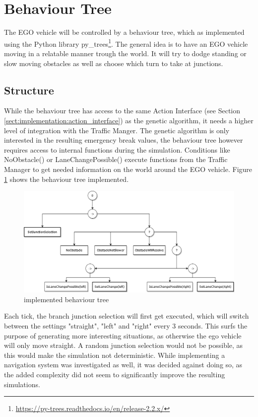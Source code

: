\section{Behaviour Tree}
The EGO vehicle will be controlled by a behaviour tree, which as implemented using the Python library py\_trees\footnote{\href{https://py-trees.readthedocs.io/en/release-2.2.x/}{https://py-trees.readthedocs.io/en/release-2.2.x/}}. The general idea is to have an EGO vehicle moving in a relatable manner trough the world. It will try to dodge standing or slow moving obstacles as well as choose which turn to take at junctions. 

\subsection{Structure}
While the behaviour tree has access to the same Action Interface (see Section \ref{sect:implementation:action_interface}) as the genetic algorithm, it needs a higher level of integration with the Traffic Manger. The genetic algorithm is only interested in the resulting emergency break values, the behaviour tree however requires access to internal functions during the simulation. Conditions like NoObstacle() or LaneChangePossible() execute functions from the Traffic Manager to get needed information on the world around the EGO vehicle. Figure \ref{fig:implementation:bt} shows the behaviour tree implemented.

\begin{figure}[ht] 
	\includegraphics[width=1\linewidth]{figures/behaviorTree}
	\caption{implemented behaviour tree}
	\label{fig:implementation:bt}
\end{figure}

Each tick, the branch junction selection will first get executed, which will switch between the settings "straight", "left" and "right" every 3 seconds. This surfs the purpose of generating more interesting situations, as otherwise the ego vehicle will only move straight. A random junction selection would not be possible, as this would make the simulation not deterministic. While implementing a navigation system was investigated as well, it was decided against doing so, as the added complexity did not seem to significantly improve the resulting simulations.

